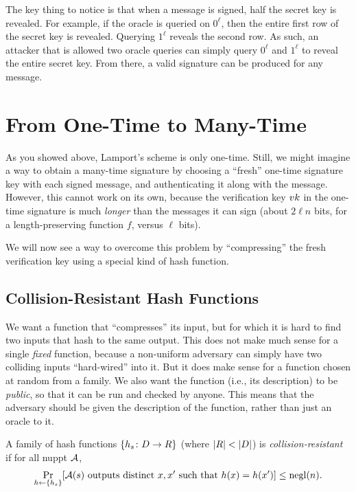 \documentclass[11pt]{article}
\begin{document}
\begin{answer}
  The key thing to notice is that when a message is signed, half the
  secret key is revealed. For example, if the oracle is queried on
  \(0^\ell\), then the entire first row of the secret key is
  revealed. Querying \(1^\ell\) reveals the second row. As such, an
  attacker that is allowed two oracle queries can simply query
  \(0^\ell\) and \(1^\ell\) to reveal the entire secret key. From
  there, a valid signature can be produced for any message.
\end{answer}

\section{From One-Time to Many-Time}
\label{sec:many-time-signatures}

As you showed above, Lamport's scheme is only one-time. Still, we
might imagine a way to obtain a many-time signature by choosing a
``fresh'' one-time signature key with each signed message, and
authenticating it along with the message.  However, this cannot work
on its own, because the verification key $vk$ in the one-time
signature is much \emph{longer} than the messages it can sign (about
$2 \ell n$ bits, for a length-preserving function $f$, versus $\ell$
bits).

We will now see a way to overcome this problem by ``compressing'' the
fresh verification key using a special kind of hash function.

\subsection{Collision-Resistant Hash Functions}
\label{sec:coll-resist-hash}

We want a function that ``compresses'' its input, but for which it is
hard to find two inputs that hash to the same output.  This does not
make much sense for a single \emph{fixed} function, because a
non-uniform adversary can simply have two colliding inputs
``hard-wired'' into it.  But it does make sense for a function chosen
at random from a family.  We also want the function (i.e., its
description) to be \emph{public}, so that it can be run and checked by
anyone.  This means that the adversary should be given the description
of the function, rather than just an oracle to it.

\begin{definition}
  A family of hash functions $\{h_s \colon D \to R\}$ (where
  $\lvert R\rvert < \lvert D\rvert$) is \emph{collision-resistant} if for all nuppt
  $\mathcal{A}$,
  \[ \Pr_{h \gets \{ h_s \}} [\mathcal{A}(s) \text{ outputs distinct } x, x'
  \text{ such that } h(x) = h(x')] \leq \operatorname{negl}(n). \]
\end{definition}
\end{document}
